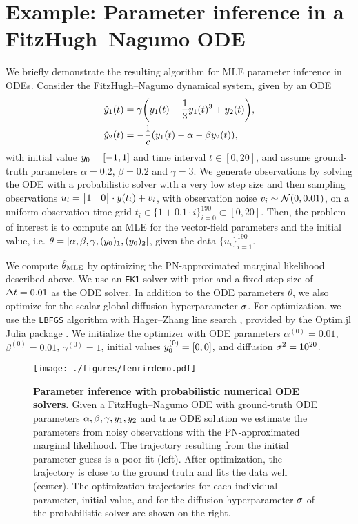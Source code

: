 \documentclass{mimosis}
\begin{document}
\section{Example: Parameter inference in a FitzHugh--Nagumo ODE}
\label{sec:org5d3e7fd}
\label{sec:fenrir:exp1}
We briefly demonstrate the resulting algorithm for MLE parameter inference in ODEs.
Consider the FitzHugh--Nagumo dynamical system, given by an ODE
\begin{subequations}
\begin{align}
  \dot{\val}_1(t) &= \gamma \left( \val_1(t) - \frac{1}{3} \val_1(t)^3 + \val_2(t) \right), \\
  \dot{\val}_2(t) &= - \frac{1}{c} \left( \val_1(t) - \alpha - \beta \val_2(t) \right),
\end{align}
\end{subequations}
with initial value \(y_0 = [-1, 1]\) and time interval \(t \in [0, 20]\),
and assume ground-truth parameters \(\alpha=0.2\), \(\beta=0.2\) and \(\gamma=3\).
We generate observations by solving the ODE with a probabilistic solver with a very low step size and then sampling observations
\(u_i = \mqty[1 & 0] \cdot \val(t_i) + v_i\),
with observation noise \(v_i \sim \N(0, 0.01)\),
on a uniform observation time grid \(t_i \in \{1 + 0.1 \cdot i\}_{i=0}^{190} \subset [0, 20]\).
Then, the problem of interest is to compute an MLE for the vector-field parameters and the initial value, i.e. \(\theta = [\alpha, \beta, \gamma, (y_0)_1, (y_0)_2]\),
given the data \(\{u_i\}_{i=1}^{190}\).

We compute \(\hat{\theta}_\text{MLE}\) by optimizing the PN-approximated marginal likelihood described above.
We use an \texttt{EK1} solver with  prior and a fixed step-size of \({\Delta t} = 0.01\) as the ODE solver.
In addition to the ODE parameters \(\theta\), we also optimize for the scalar global diffusion hyperparameter \(\sigma\).
For optimization, we use the \texttt{LBFGS} algorithm with Hager--Zhang line search \parencite{hagerzhang}, provided by the Optim.jl Julia package \parencite{optimjl}.
We initialize the optimizer with
ODE parameters \(\alpha^{(0)}=0.01\), \(\beta^{(0)}=0.01\), \(\gamma^{(0)}=1\),
initial values \(y_0^{(0)}=[0, 0]\),
and diffusion \(\sigma^2=10^{20}\).

\begin{figure}[t]
\centering
\texttt{[image: ./figures/fenrirdemo.pdf]}
\caption{\label{fig:fenrir:fenrirdemo}\textbf{Parameter inference with probabilistic numerical ODE solvers.} Given a FitzHugh--Nagumo ODE with ground-truth ODE parameters \(\alpha, \beta, \gamma, y_1, y_2\) and true ODE solution we estimate the parameters from noisy observations with the PN-approximated marginal likelihood. The trajectory resulting from the initial parameter guess is a poor fit (left). After optimization, the trajectory is close to the ground truth and fits the data well (center). The optimization trajectories for each individual parameter, initial value, and for the diffusion hyperparameter \(\sigma\) of the probabilistic solver are shown on the right.}
\end{figure}
\end{document}
